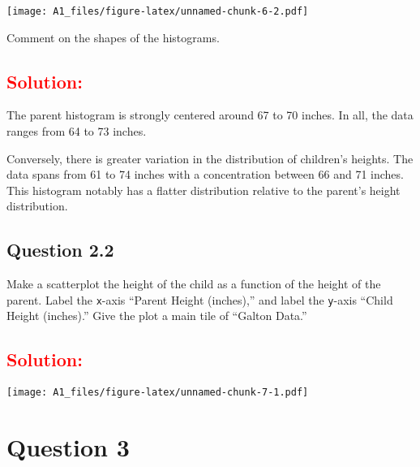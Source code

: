 \documentclass[]{article}
\newenvironment{Shaded}{\begin{snugshade}}{\end{snugshade}}
\newcommand{\KeywordTok}[1]{\textcolor[rgb]{0.13,0.29,0.53}{\textbf{#1}}}
\newcommand{\DataTypeTok}[1]{\textcolor[rgb]{0.13,0.29,0.53}{#1}}
\newcommand{\StringTok}[1]{\textcolor[rgb]{0.31,0.60,0.02}{#1}}
\newcommand{\OperatorTok}[1]{\textcolor[rgb]{0.81,0.36,0.00}{\textbf{#1}}}
\newcommand{\NormalTok}[1]{#1}
\begin{document}
\texttt{[image: A1\_files/figure-latex/unnamed-chunk-6-2.pdf]}

Comment on the shapes of the histograms.

\subsection{\texorpdfstring{\textcolor{red}{Solution:}}{}}\label{section-6}

The parent histogram is strongly centered around 67 to 70 inches. In
all, the data ranges from 64 to 73 inches.

Conversely, there is greater variation in the distribution of children's
heights. The data spans from 61 to 74 inches with a concentration
between 66 and 71 inches. This histogram notably has a flatter
distribution relative to the parent's height distribution.

\subsection{Question 2.2}\label{question-2.2}

Make a scatterplot the height of the child as a function of the height
of the parent. Label the \texttt{x}-axis ``Parent Height (inches),'' and
label the \texttt{y}-axis ``Child Height (inches).'' Give the plot a
main tile of ``Galton Data.''

\subsection{\texorpdfstring{\textcolor{red}{Solution:}}{}}\label{section-7}

\begin{Shaded}
\end{Shaded}

\texttt{[image: A1\_files/figure-latex/unnamed-chunk-7-1.pdf]}

\section{Question 3}\label{question-3}
\end{document}
